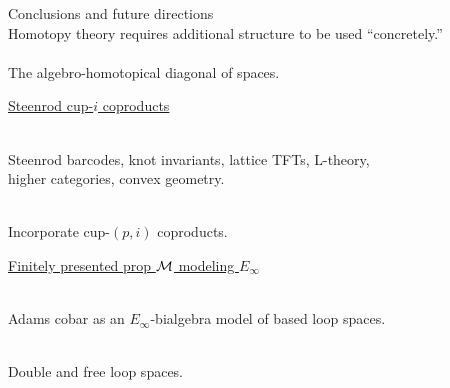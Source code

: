 
\begin{frame}{Conclusions and future directions}
	\pause
	 \\
	Homotopy theory requires additional structure to be used ``concretely.'' \\

	\medskip\pause
	 \\
	The algebro-homotopical diagonal of spaces.

	\medskip\pause
	\underline{Steenrod cup-$i$ coproducts}

	\medskip\pause
	 \\
	Steenrod barcodes, knot invariants, lattice TFTs, L-theory, \\
	higher categories, convex geometry.

	\smallskip\pause
	 \\
	Incorporate cup-$(p,i)$ coproducts.

	\medskip\pause
	\underline{Finitely presented prop $\mathcal{M}$ modeling $E_\infty$}

	\medskip\pause
	 \\
	Adams cobar as an $E_\infty$-bialgebra model of based loop spaces.

	\smallskip\pause
	 \\
	Double and free loop spaces.
\end{frame}